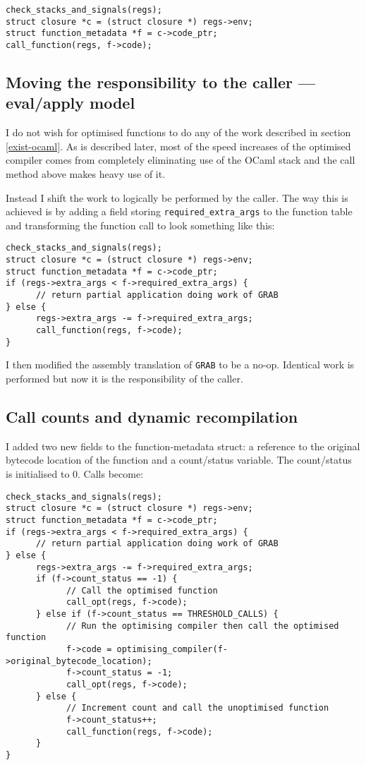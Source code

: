 \begin{verbatim}
check_stacks_and_signals(regs);
struct closure *c = (struct closure *) regs->env;
struct function_metadata *f = c->code_ptr;
call_function(regs, f->code);
\end{verbatim}

\subsection{Moving the responsibility to the caller --- eval/apply model}

I do not wish for optimised functions to do any of the work described in section \ref{exist-ocaml}.
As is described later, most of the speed increases of the optimised compiler comes from completely
eliminating use of the OCaml stack and the call method above makes heavy use of it.

Instead I shift the work to logically be performed by the caller. The way this is achieved is by
adding a
field storing \texttt{required\_extra\_args} to the function table and transforming the function
call to look something like this:

\begin{verbatim}
check_stacks_and_signals(regs);
struct closure *c = (struct closure *) regs->env;
struct function_metadata *f = c->code_ptr;
if (regs->extra_args < f->required_extra_args) {
      // return partial application doing work of GRAB
} else {
      regs->extra_args -= f->required_extra_args;
      call_function(regs, f->code);
}
\end{verbatim}

I then modified the assembly translation of \texttt{GRAB} to be a no-op. Identical work is
performed but now it is the responsibility of the caller.

\subsection{Call counts and dynamic recompilation} \label{final-call-logic}

I added two new fields to the function-metadata struct: a reference to the original bytecode
location
of the function and a count/status variable.  The count/status is initialised to 0. Calls become:

\begin{verbatim}
check_stacks_and_signals(regs);
struct closure *c = (struct closure *) regs->env;
struct function_metadata *f = c->code_ptr;
if (regs->extra_args < f->required_extra_args) {
      // return partial application doing work of GRAB
} else { 
      regs->extra_args -= f->required_extra_args;
      if (f->count_status == -1) {
            // Call the optimised function
            call_opt(regs, f->code);
      } else if (f->count_status == THRESHOLD_CALLS) {
            // Run the optimising compiler then call the optimised function
            f->code = optimising_compiler(f->original_bytecode_location);
            f->count_status = -1;
            call_opt(regs, f->code);
      } else {
            // Increment count and call the unoptimised function 
            f->count_status++;
            call_function(regs, f->code);
      }
}
\end{verbatim}

